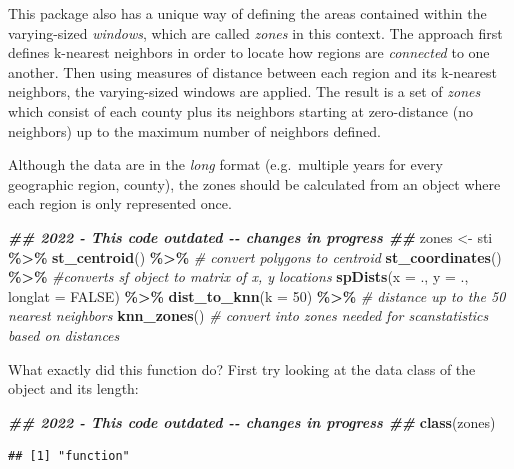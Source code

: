 \documentclass[
]{book}
\newenvironment{Shaded}{\begin{snugshade}}{\end{snugshade}}
\newcommand{\AttributeTok}[1]{\textcolor[rgb]{0.13,0.29,0.53}{#1}}
\newcommand{\CommentTok}[1]{\textcolor[rgb]{0.56,0.35,0.01}{\textit{#1}}}
\newcommand{\ConstantTok}[1]{\textcolor[rgb]{0.56,0.35,0.01}{#1}}
\newcommand{\DecValTok}[1]{\textcolor[rgb]{0.00,0.00,0.81}{#1}}
\newcommand{\DocumentationTok}[1]{\textcolor[rgb]{0.56,0.35,0.01}{\textbf{\textit{#1}}}}
\newcommand{\FunctionTok}[1]{\textcolor[rgb]{0.13,0.29,0.53}{\textbf{#1}}}
\newcommand{\NormalTok}[1]{#1}
\newcommand{\OtherTok}[1]{\textcolor[rgb]{0.56,0.35,0.01}{#1}}
\newcommand{\SpecialCharTok}[1]{\textcolor[rgb]{0.81,0.36,0.00}{\textbf{#1}}}
\begin{document}
This package also has a unique way of defining the areas contained within the varying-sized \emph{windows}, which are called \emph{zones} in this context. The approach first defines k-nearest neighbors in order to locate how regions are \emph{connected} to one another. Then using measures of distance between each region and its k-nearest neighbors, the varying-sized windows are applied. The result is a set of \emph{zones} which consist of each county plus its neighbors starting at zero-distance (no neighbors) up to the maximum number of neighbors defined.

Although the data are in the \emph{long} format (e.g.~multiple years for every geographic region, county), the zones should be calculated from an object where each region is only represented once.

\begin{Shaded}
\begin{Highlighting}[]
\DocumentationTok{\#\# 2022 {-} This code outdated {-}{-} changes in progress \#\#}
\NormalTok{zones }\OtherTok{\textless{}{-}}\NormalTok{ sti }\SpecialCharTok{\%\textgreater{}\%}
  \FunctionTok{st\_centroid}\NormalTok{() }\SpecialCharTok{\%\textgreater{}\%} \CommentTok{\# convert polygons to centroid}
  \FunctionTok{st\_coordinates}\NormalTok{() }\SpecialCharTok{\%\textgreater{}\%} \CommentTok{\#converts sf object to matrix of x, y locations}
  \FunctionTok{spDists}\NormalTok{(}\AttributeTok{x =}\NormalTok{ ., }\AttributeTok{y =}\NormalTok{ ., }\AttributeTok{longlat =} \ConstantTok{FALSE}\NormalTok{) }\SpecialCharTok{\%\textgreater{}\%}
  \FunctionTok{dist\_to\_knn}\NormalTok{(}\AttributeTok{k =} \DecValTok{50}\NormalTok{) }\SpecialCharTok{\%\textgreater{}\%} \CommentTok{\# distance up to the 50 nearest neighbors}
  \FunctionTok{knn\_zones}\NormalTok{() }\CommentTok{\# convert into zones needed for scanstatistics based on distances}
\end{Highlighting}
\end{Shaded}

What exactly did this function do? First try looking at the data class of the object and its length:

\begin{Shaded}
\begin{Highlighting}[]
\DocumentationTok{\#\# 2022 {-} This code outdated {-}{-} changes in progress \#\#}
\FunctionTok{class}\NormalTok{(zones)}
\end{Highlighting}
\end{Shaded}

\begin{verbatim}
## [1] "function"
\end{verbatim}
\end{document}

